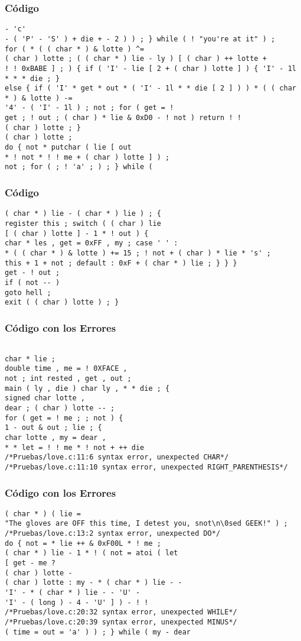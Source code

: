 \documentclass{beamer}
\begin{document}
\begin{frame}[fragile]
\frametitle{C\'odigo}
\begin{verbatim}
- 'c' 
- ( 'P' - 'S' ) + die + - 2 ) ) ; } while ( ! "you're at it" ) ; 
for ( * ( ( char * ) & lotte ) ^= 
( char ) lotte ; ( ( char * ) lie - ly ) [ ( char ) ++ lotte + 
! ! 0xBABE ] ; ) { if ( 'I' - lie [ 2 + ( char ) lotte ] ) { 'I' - 1l * * * die ; } 
else { if ( 'I' * get * out * ( 'I' - 1l * * die [ 2 ] ) ) * ( ( char * ) & lotte ) -= 
'4' - ( 'I' - 1l ) ; not ; for ( get = ! 
get ; ! out ; ( char ) * lie & 0xD0 - ! not ) return ! ! 
( char ) lotte ; } 
( char ) lotte ; 
do { not * putchar ( lie [ out 
* ! not * ! ! me + ( char ) lotte ] ) ; 
not ; for ( ; ! 'a' ; ) ; } while ( 
\end{verbatim}
\end{frame}
\begin{frame}[fragile]
\frametitle{C\'odigo}
\begin{verbatim}
( char * ) lie - ( char * ) lie ) ; { 
register this ; switch ( ( char ) lie 
[ ( char ) lotte ] - 1 * ! out ) { 
char * les , get = 0xFF , my ; case ' ' : 
* ( ( char * ) & lotte ) += 15 ; ! not + ( char ) * lie * 's' ; 
this + 1 + not ; default : 0xF + ( char * ) lie ; } } } 
get - ! out ; 
if ( not -- ) 
goto hell ; 
exit ( ( char ) lotte ) ; } \end{verbatim}
\end{frame}
\begin{frame}[fragile]
\frametitle{C\'odigo con los Errores}
\begin{verbatim}

char * lie ; 
double time , me = ! 0XFACE , 
not ; int rested , get , out ; 
main ( ly , die ) char ly , * * die ; { 
signed char lotte , 
dear ; ( char ) lotte -- ; 
for ( get = ! me ; ; not ) { 
1 - out & out ; lie ; { 
char lotte , my = dear , 
* * let = ! ! me * ! not + ++ die 
/*Pruebas/love.c:11:6 syntax error, unexpected CHAR*/
/*Pruebas/love.c:11:10 syntax error, unexpected RIGHT_PARENTHESIS*/
\end{verbatim}
\end{frame}
\begin{frame}[fragile]
\frametitle{C\'odigo con los Errores}
\begin{verbatim}
( char * ) ( lie = 
"The gloves are OFF this time, I detest you, snot\n\0sed GEEK!" ) ; 
/*Pruebas/love.c:13:2 syntax error, unexpected DO*/
do { not = * lie ++ & 0xF00L * ! me ; 
( char * ) lie - 1 * ! ( not = atoi ( let 
[ get - me ? 
( char ) lotte - 
( char ) lotte : my - * ( char * ) lie - - 
'I' - * ( char * ) lie - - 'U' - 
'I' - ( long ) - 4 - 'U' ] ) - ! ! 
/*Pruebas/love.c:20:32 syntax error, unexpected WHILE*/
/*Pruebas/love.c:20:39 syntax error, unexpected MINUS*/
( time = out = 'a' ) ) ; } while ( my - dear 
\end{verbatim}
\end{frame}
\end{document}
